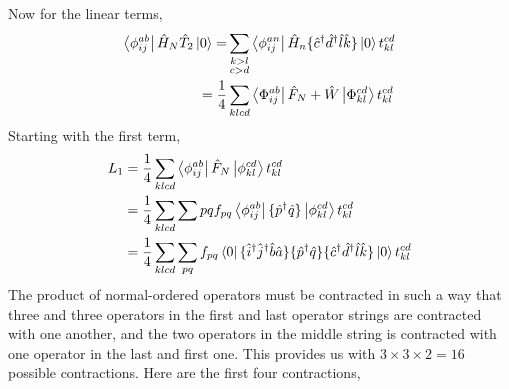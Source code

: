 Now for the linear terms,
\begin{equation}
    \begin{aligned}
         \bra{\phi^{ab}_{ij}} \hat{H}_N \hat{T}_2 \ket{0} 
            = &\sum_{\substack{k>l \\ c>d}} \bra{\phi^{an}_{ij}} \hat{H}_n 
                \{\hat{c}^\dagger \hat{d}^\dagger \hat{l} \hat{k} \} \ket{0}t^{cd}_{kl} \\
            = \frac{1}{4} &\sum_{klcd} \bra{\Phi^{ab}_{ij}} \hat{F}_N + \hat{W}\ket{\Phi^{cd}_{kl}}t^{cd}_{kl}
    \end{aligned}
\end{equation}
Starting with the first term,
\begin{equation}
    \begin{aligned}
         L_1 &= \frac{1}{4}\sum_{klcd} \bra{\phi^{ab}_{ij}} \hat{F}_N \ket{\phi^{cd}_{kl}} t^{cd}_{kl} \\
            &= \frac{1}{4}\sum_{klcd} \sum{pq} f_{pq} \bra{\phi^{ab}_{ij}}
                \{ \hat{p}^\dagger \hat{q}\} \ket{\phi^{cd}_{kl}} t^{cd}_{kl} \\
            &= \frac{1}{4} \sum_{klcd}\sum_{pq} f_{pq} \bra{0}
                \{\hat{i}^\dagger \hat{j}^\dagger \hat{b} \hat{a} \}
                \{\hat{p}^\dagger \hat{q}\} 
                \{\hat{c}^\dagger \hat{d}^\dagger \hat{l} \hat{k} \}
            \ket{0} t^{cd}_{kl}
    \end{aligned}
\end{equation}
The product of normal-ordered operators must be contracted in such a way that three and
three operators in the first and last operator strings are contracted with one another,
and the two operators in the middle string is contracted with one operator in the last
and first one. This provides us with $3\times 3 \times 2 = 16$ possible contractions.
Here are the first four contractions,
